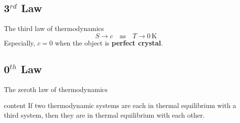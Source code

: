 \documentclass[12pt,compress]{beamer}
\begin{document}
\subsection{3$^{rd}$ Law}
\begin{frame}{The third law of thermodynamics}
    $$
        S \rightarrow c\quad \text{as}\quad T \rightarrow 0\,\text{K}
    $$
    Especially, $c=0$ when the object is \textbf{perfect crystal}.
\end{frame}

\subsection{0$^{th}$ Law}
\begin{frame}{The zeroth law of thermodynamics}
    \begin{block}{content}
        If two thermodynamic systems are each in thermal equilibrium with a third system, then they are in thermal equilibrium with each other.
    \end{block}
\end{frame}
\end{document}
